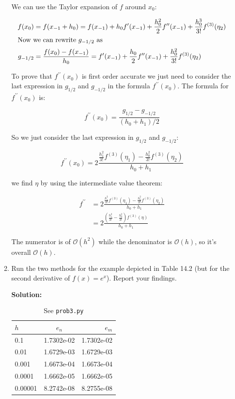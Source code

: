\documentclass[12pt]{article}
\newcommand{\pprime}{\prime \prime}
\newcommand{\BigO}[1]{\mathcal{O}\left( #1 \right)}
\begin{document}
\begin{enumerate}
\begin{enumerate}
We can use the Taylor expansion of $f$ around $x_{0}$:

\begin{align*}
f(x_{0}) &= f(x_{-1} + h_{0}) = f(x_{-1}) + h_{0}f^{\prime}(x_{-1}) + \frac{h_{0}^{2}}{2}f^{\pprime}(x_{-1}) + \frac{h_{0}^{3}}{3!}f^{(3)}(\eta_{2})\\
\intertext{Now we can rewrite $g_{-1/2}$ as}
g_{-1/2} &= \frac{f(x_{0}) - f(x_{-1})}{h_{0}} = f^{\prime}(x_{-1}) + \frac{h_{0}}{2}f^{\pprime}(x_{-1}) + \frac{h_{0}^{2}}{3!}f^{(3)}(\eta_{2})
\end{align*}

To prove that $f^{\pprime}(x_{0})$ is first order accurate we just need to consider the last expression in $g_{1/2}$ and $g_{-1/2}$ in the formula $f^{\pprime}(x_{0})$. The formula for $f^{\pprime}(x_{0})$ is:

\[
f^{\pprime}(x_{0}) = \frac{g_{1/2} - g_{-1/2}}{(h_{0} + h_{1})/2}
\]

So we just consider the last expression in $g_{1/2}$ and $g_{-1/2}$:

\[
f^{\pprime}(x_{0}) = 2\frac{\frac{h_{1}^{2}}{3!}f^{(3)}(\eta_{1}) - \frac{h_{0}^{2}}{3!}f^{(3)}(\eta_{2})}{h_{0} + h_{1}}
\]

we find $\eta$ by using the intermediate value theorem:

\begin{align*}
f^{\pprime} &=  2\frac{\frac{h_{1}^{2}}{3!}f^{(3)}(\eta_{1}) - \frac{h_{0}^{2}}{3!}f^{(3)}(\eta_{2})}{h_{0} + h_{1}}\\
                    &= 2 \frac{\left(\frac{h_{1}^{2}}{3!} - \frac{h_{0}^{2}}{3!}\right)f^{(3)}(\eta)}{h_{0} + h_{1}}
\end{align*}

The numerator is of $\BigO{h^{2}}$ while the denominator is $\BigO{h}$, so it's overall $\BigO{h}$.

\item Run the two methods for the example depicted in Table 14.2 (but for the second derivative of $f(x) = e^{x}$). Report your findings.

{\bf Solution:}


\begin{table}[H]
\centering
\begin{tabular}{l c r}
\hline\hline
$h$ & $e_{n}$ & $e_{m}$\\
\hline
0.1  &  1.7302e-02  &  1.7302e-02 \\
0.01  &  1.6729e-03  &  1.6729e-03 \\
0.001  &  1.6673e-04  &  1.6673e-04 \\
0.0001  &  1.6662e-05  &  1.6662e-05 \\
0.00001  &  8.2742e-08  &  8.2755e-08 \\
\hline
\end{tabular}
\caption{See {\tt prob3.py}}
\end{table}


\end{enumerate}
\end{enumerate}
\end{document}
